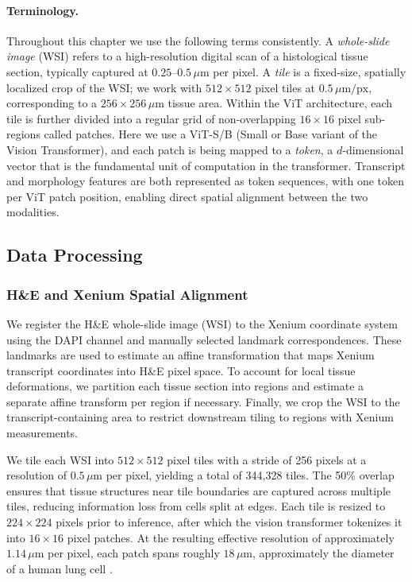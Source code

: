 \paragraph{Terminology.}
Throughout this chapter we use the following terms consistently. A \emph{whole-slide image} (WSI) refers to a high-resolution digital scan of a histological tissue section, typically captured at $0.25$--$0.5\,\mu\text{m}$ per pixel. A \emph{tile} is a fixed-size, spatially localized crop of the WSI; we work with $512 \times 512$ pixel tiles at $0.5\,\mu\text{m}/\text{px}$, corresponding to a $256 \times 256\,\mu\text{m}$ tissue area. Within the ViT architecture, each tile is further divided into a regular grid of non-overlapping $16 \times 16$ 
pixel sub-regions called patches. Here we use a ViT-S/B (Small or Base variant of the Vision Transformer), 
and each patch is being mapped to a \emph{token}, a $d$-dimensional vector that is the fundamental unit of computation 
in the transformer. Transcript and morphology features are both represented as token sequences, with one token 
per ViT patch position, enabling direct spatial alignment between the two modalities.

\subsection*{Data Processing}
\label{sec:data-processing}

\subsubsection{H\&E and Xenium Spatial Alignment}
\label{sec:he-and-xenium-spatial-alignment}

We register the H\&E whole-slide image (WSI) to the Xenium coordinate system using the DAPI channel and manually selected landmark correspondences. These landmarks are used to estimate an affine transformation that maps Xenium transcript coordinates into H\&E pixel space. To account for local tissue deformations, we partition each tissue section into regions and estimate a separate affine transform per region if necessary. Finally, we crop the WSI to the transcript-containing area to restrict downstream tiling to regions with Xenium measurements.

We tile each WSI into $512\times512$ pixel tiles with a stride of 256 pixels at 
a resolution of $0.5\,\mu$m per pixel, yielding a total of 344{,}328 tiles. The 
50\% overlap ensures that tissue structures near tile boundaries are captured 
across multiple tiles, reducing information loss from cells split at edges. Each 
tile is resized to $224\times224$ pixels prior to inference, after which the 
vision transformer tokenizes it into $16\times16$ pixel patches. At the resulting 
effective resolution of approximately $1.14\,\mu$m per pixel, each patch spans 
roughly $18\,\mu$m, approximately the diameter of a human lung cell
\cite{crapo_cellnumbercell_1982}.

